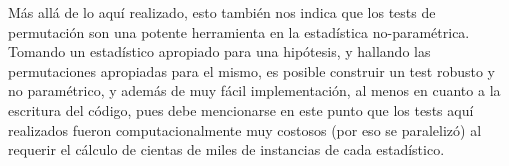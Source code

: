 \documentclass[letter]{article}
\begin{document}
Más allá de lo aquí realizado, esto también nos indica que los tests de permutación son una potente herramienta en la estadística no-paramétrica. Tomando un estadístico apropiado para una hipótesis, y hallando las permutaciones apropiadas para el mismo, es posible construir un test robusto y no paramétrico, y además de muy fácil implementación, al menos en cuanto a la escritura del código, pues debe mencionarse en este punto que los tests aquí realizados fueron computacionalmente muy costosos (por eso se paralelizó) al requerir el cálculo de cientas de miles de instancias de cada estadístico.

\nocite{FangSymmetricDistributions}



\end{document}
